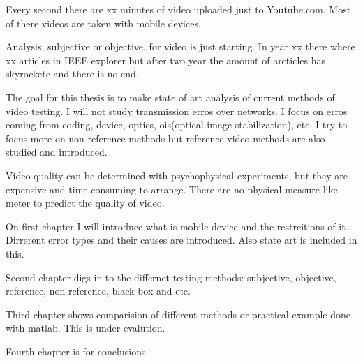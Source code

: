 
Every second there are xx minutes of video uploaded just to Youtube.com. Most
of there videos are taken with mobile devices. 

Analysis, subjective or objective, for video is just starting. In year xx
there where xx articles in IEEE explorer but after two year the amount of
arcticles has skyrockete and there is no end. 

The goal for this thesis is to make state of art analysis of current methods
of video testing. I will not study transmission erros over networks. I focus 
on erros coming from coding, device, optics,
ois(optical image stabilization), etc. I try to focus more on non-reference
methods but reference video methods are also studied and introduced. 

Video quality can be determined with psychophysical experiments, but they are
expensive and time consuming to arrange. There are no physical measure like
meter to predict the quality of video. 


On first chapter I will introduce what is mobile device and the restrcitions
of it. Dirrerent error types and their causes are introduced. Also state art
is included in this. 

Second chapter digs in to the differnet testing methods: 
subjective, objective, reference, non-reference, black box and etc. 

Third chapter shows comparision of different methods or practical example
done with matlab. This is under evalution. 

Fourth chapter is for conclusions. 
